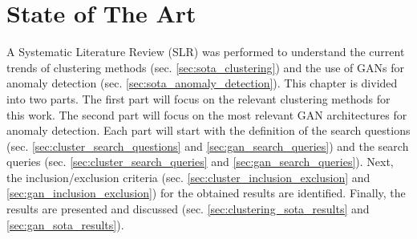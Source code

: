 \chapter{State of The Art} \label{chap:sota}



A Systematic Literature Review (SLR) was performed to understand the current trends of clustering methods (sec. \ref{sec:sota_clustering}) and the use of GANs for anomaly detection (sec. \ref{sec:sota_anomaly_detection}). This chapter is divided into two parts. The first part will focus on the relevant clustering methods for this work. The second part will focus on the most relevant GAN architectures for anomaly detection. Each part will start with the definition of the search questions (sec. \ref{sec:cluster_search_questions} and \ref{sec:gan_search_queries}) and the search queries (sec. \ref{sec:cluster_search_queries} and \ref{sec:gan_search_queries}). Next, the inclusion/exclusion criteria (sec. \ref{sec:cluster_inclusion_exclusion} and \ref{sec:gan_inclusion_exclusion}) for the obtained results are identified. Finally, the results are presented and discussed (sec. \ref{sec:clustering_sota_results} and \ref{sec:gan_sota_results}).


